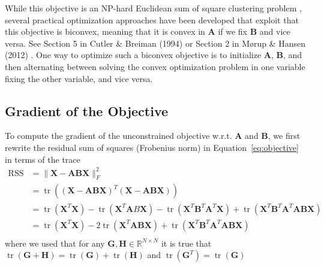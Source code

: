 \documentclass[oneside]{article}
\begin{document}
While this objective is an NP-hard Euclidean sum of square clustering problem \autocite{aloiseNPhardnessEuclideanSumofsquares2009}, several practical optimization approaches have been developed that exploit that this objective is biconvex, meaning that it is convex in $\mathbf{A}$ if we fix $\mathbf{B}$ and vice versa. See Section 5 in Cutler \& Breiman (1994) \autocite{cutlerArchetypalAnalysis1994} or Section 2 in Mørup \& Hansen (2012) \autocite{morupArchetypalAnalysisMachine2012}. One way to optimize such a biconvex objective is to initialize $\mathbf{A}$, $\mathbf{B}$, and then alternating between solving the convex optimization problem in one variable fixing the other variable, and vice versa.

\subsection{Gradient of the Objective}

To compute the gradient of the unconstrained objective w.r.t. $\mathbf{A}$ and $\mathbf{B}$, we first rewrite the residual sum of squares (Frobenius norm) in Equation~\eqref{eq:objective} in terms of the trace
\begin{equation}
\begin{aligned}
\operatorname{RSS} &= \| \mathbf{X} - \mathbf{A} \mathbf{B} \mathbf{X}\|_F^2 \\
&= \operatorname{tr} \left( \left( \mathbf{X} - \mathbf{A} \mathbf{B} \mathbf{X} \right)^T \left( \mathbf{X} - \mathbf{A} \mathbf{B} \mathbf{X} \right) \right) \\
&=  \operatorname{tr}(\mathbf{X}^T \mathbf{X}) - \operatorname{tr}(\mathbf{X}^T \mathbf{A} B \mathbf{X}) - \operatorname{tr}(\mathbf{X}^T \mathbf{B}^T \mathbf{A}^T \mathbf{X}) + \operatorname{tr}(\mathbf{X}^T \mathbf{B}^T \mathbf{A}^T \mathbf{A} \mathbf{B} \mathbf{X}) \\
&=  \operatorname{tr}(\mathbf{X}^T \mathbf{X}) - 2 \operatorname{tr}(\mathbf{X}^T \mathbf{A} \mathbf{B} \mathbf{X}) + \operatorname{tr}(\mathbf{X}^T \mathbf{B}^T \mathbf{A}^T \mathbf{A} \mathbf{B} \mathbf{X}) \\
\end{aligned}
\tag{5}
\end{equation}
where we used that for any $\mathbf{G}, \mathbf{H} \in \mathbb{R}^{N \times N}$ it is true that $\operatorname{tr}(\mathbf{G} + \mathbf{H}) = \operatorname{tr}(\mathbf{G})+\operatorname{tr}(\mathbf{H})$ and $\operatorname{tr}(\mathbf{G}^T)=\operatorname{tr}(\mathbf{G})$
\end{document}
